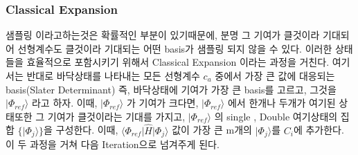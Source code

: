 \documentclass[11pt]{article}
\begin{document}
\subsubsection{Classical Expansion}
샘플링 이라고하는것은 확률적인 부분이 있기때문에, 분명 그 기여가 클것이라 기대되어 선형계수도 클것이라 기대되는 어떤 basis가 샘플링 되지 않을 수 있다. 이러한 상태들을 효율적으로 포함시키기 위해서 
Classical Expansion 이라는 과정을 거친다. 
여기서는 반대로 바닥상태를 나타내는 모든 선형계수 \(c_a\) 중에서 가장 큰 값에 대응되는 basis(Slater Determinant) 즉, 바닥상태에 기여가 가장 큰 basis를 고르고, 그것을 \(\vert \Phi_{ref} \rangle \) 라고 하자. 
이때, \(\vert \Phi_{ref} \rangle \) 가 기여가 크다면, \(\vert \Phi_{ref} \rangle \) 에서 한개나 두개가 여기된 상태또한 그 기여가 클것이라는 기대를 가지고, 
\(\vert \Phi_{ref} \rangle \) 의 single , Double 여기상태의 집합 \(\{\vert \Phi_j \rangle \}\)을 구성한다. 
이때, \(\langle \Phi_{ref} \vert \hat{H} \vert \Phi_j \rangle\) 값이 가장 큰 m개의 \(\vert \Phi_j \rangle \)를 \(C_i\)에 추가한다. 
이 두 과정을 거쳐 다음 Iteration으로 넘겨주게 된다. 
\end{document}
